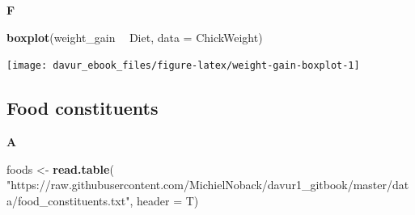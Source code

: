 \documentclass[]{book}
\newenvironment{Shaded}{\begin{snugshade}}{\end{snugshade}}
\newcommand{\CommentTok}[1]{\textcolor[rgb]{0.56,0.35,0.01}{\textit{#1}}}
\newcommand{\DataTypeTok}[1]{\textcolor[rgb]{0.13,0.29,0.53}{#1}}
\newcommand{\KeywordTok}[1]{\textcolor[rgb]{0.13,0.29,0.53}{\textbf{#1}}}
\newcommand{\NormalTok}[1]{#1}
\newcommand{\OperatorTok}[1]{\textcolor[rgb]{0.81,0.36,0.00}{\textbf{#1}}}
\newcommand{\StringTok}[1]{\textcolor[rgb]{0.31,0.60,0.02}{#1}}
\begin{document}
\begin{Shaded}
\end{Shaded}

\textbf{F}

\begin{Shaded}
\begin{Highlighting}[]
\KeywordTok{boxplot}\NormalTok{(weight_gain }\OperatorTok{~}\StringTok{ }\NormalTok{Diet, }\DataTypeTok{data =}\NormalTok{ ChickWeight)}
\end{Highlighting}
\end{Shaded}

\begin{center}\texttt{[image: davur\_ebook\_files/figure-latex/weight-gain-boxplot-1]} \end{center}

\hypertarget{food-constituents-1}{%
\subsection{Food constituents}\label{food-constituents-1}}

\textbf{A}

\begin{Shaded}
\begin{Highlighting}[]
\NormalTok{foods <-}\StringTok{ }\KeywordTok{read.table}\NormalTok{(}
        \StringTok{"https://raw.githubusercontent.com/MichielNoback/davur1_gitbook/master/data/food_constituents.txt"}\NormalTok{, }\DataTypeTok{header =}\NormalTok{ T)}
\end{Highlighting}
\end{Shaded}

\begin{Shaded}
\end{Shaded}
\end{document}
